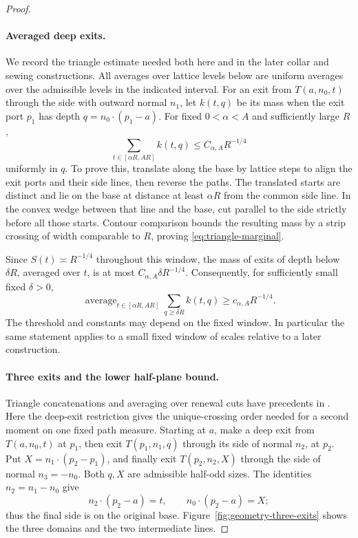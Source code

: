 \begin{proof}
\paragraph{Averaged deep exits.}
We record the triangle estimate needed both here and in the later collar and sewing constructions. All averages over lattice levels below are uniform averages over the admissible levels in the indicated interval. For an exit from \(T(a,n_0,t)\) through the side with outward normal \(n_1\), let \(k(t,q)\) be its mass when the exit port \(p_1\) has depth \(q=n_0\cdot(p_1-a)\). For fixed \(0<\alpha<A\) and sufficiently large \(R\),
\begin{equation}\label{eq:triangle-marginal}
 \sum_{t\in[\alpha R,AR]}k(t,q)\le C_{\alpha,A}R^{-1/4}
\end{equation}
uniformly in \(q\). To prove this, translate along the base by lattice steps to align the exit ports and their side lines, then reverse the paths. The translated starts are distinct and lie on the base at distance at least \(\alpha R\) from the common side line. In the convex wedge between that line and the base, cut parallel to the side strictly before all those starts. Contour comparison bounds the resulting mass by a strip crossing of width comparable to \(R\), proving \eqref{eq:triangle-marginal}.

Since \(S(t)\asymp R^{-1/4}\) throughout this window, the mass of exits of depth below \(\delta R\), averaged over \(t\), is at most \(C_{\alpha,A}\delta R^{-1/4}\). Consequently, for sufficiently small fixed \(\delta>0\),
\begin{equation}\label{eq:deep-triangle-exit}
 \mathop{\mathrm{average}}_{t\in[\alpha R,AR]}
       \sum_{q\ge\delta R}k(t,q)\ge c_{\alpha,A}R^{-1/4}.
\end{equation}
The threshold and constants may depend on the fixed window. In particular the same statement applies to a small fixed window of scales relative to a later construction.

\paragraph{Three exits and the lower half-plane bound.}
Triangle concatenations and averaging over renewal cuts have precedents in \cite{GlazmanManolescu2017,KrachunPanagiotis2026}. Here the deep-exit restriction gives the unique-crossing order needed for a second moment on one fixed path measure.
Starting at \(a\), make a deep exit from \(T(a,n_0,t)\) at \(p_1\), then exit \(T(p_1,n_1,q)\) through its side of normal \(n_2\), at \(p_2\). Put \(X=n_1\cdot(p_2-p_1)\), and finally exit \(T(p_2,n_2,X)\) through the side of normal \(n_3=-n_0\). Both \(q,X\) are admissible half-odd sizes. The identities \(n_2=n_1-n_0\) give
\[
 n_2\cdot(p_2-a)=t,\qquad n_0\cdot(p_2-a)=X;
\]
thus the final side is on the original base. Figure~\ref{fig:geometry-three-exits} shows the three domains and the two intermediate lines.



\end{proof}
